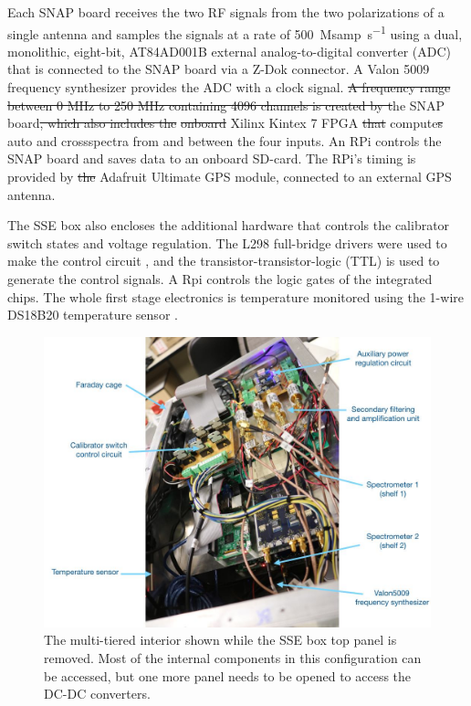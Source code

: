 Each SNAP board receives the two RF signals from the two polarizations of a single antenna and samples the signals at a rate of \SI{500}{\mega samp\per \second} using a dual, monolithic, eight-bit, AT84AD001B external analog-to-digital converter (ADC) that is connected to the SNAP board via a Z-Dok connector. A Valon 5009 frequency synthesizer provides the ADC with a clock signal. \st{A frequency range between 0 MHz to 250 MHz containing 4096 channels is created by t}he SNAP board\st{, which also includes the}  \st{onboard} Xilinx Kintex 7 FPGA  \st{that} compute\st{s} auto\attention{-} and cross\attention{-}spectra from and between the four inputs. An RPi controls the SNAP board and saves data to an onboard SD-card. The RPi's timing is provided by \st{the}  Adafruit Ultimate GPS module, connected to an external  GPS antenna.

The SSE box also encloses the additional hardware that controls the calibrator switch states and voltage regulation. The L298 full-bridge drivers were used to make the control circuit , and the transistor-transistor-logic (TTL) is used to generate the control signals. A Rpi controls the logic gates of the integrated chips. The whole first stage electronics is temperature monitored using the 1-wire DS18B20 temperature sensor .

\begin{figure}
	\centering
	\includegraphics[width=\linewidth]{Figures/enclosure_ann}
	\caption{The multi-tiered interior shown while the SSE box top panel is removed. Most of the internal components in this configuration can be accessed, but one more panel needs to be opened to access the DC-DC converters.}
	\label{Fig:enclosure_ann}
\end{figure}

